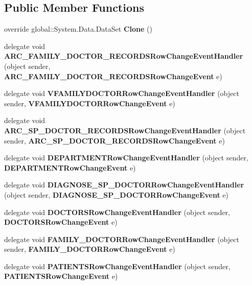 \subsection*{Public Member Functions}
\begin{CompactItemize}
\item 
override global::System.Data.DataSet \textbf{Clone} ()\label{class_automatic_medical_system_1_1_data_set1_3616d17384c19131785e376106ff992d}

\item 
delegate void \textbf{ARC\_\-FAMILY\_\-DOCTOR\_\-RECORDSRowChangeEventHandler} (object sender, {\bf ARC\_\-FAMILY\_\-DOCTOR\_\-RECORDSRowChangeEvent} e)\label{class_automatic_medical_system_1_1_data_set1_9270d1a44c7ed5979a4c626f8156d23b}

\item 
delegate void \textbf{VFAMILYDOCTORRowChangeEventHandler} (object sender, {\bf VFAMILYDOCTORRowChangeEvent} e)\label{class_automatic_medical_system_1_1_data_set1_c97eabfd791967c4874f9c057512422a}

\item 
delegate void \textbf{ARC\_\-SP\_\-DOCTOR\_\-RECORDSRowChangeEventHandler} (object sender, {\bf ARC\_\-SP\_\-DOCTOR\_\-RECORDSRowChangeEvent} e)\label{class_automatic_medical_system_1_1_data_set1_fdf19b441332bbeb510240faa8c47c3c}

\item 
delegate void \textbf{DEPARTMENTRowChangeEventHandler} (object sender, {\bf DEPARTMENTRowChangeEvent} e)\label{class_automatic_medical_system_1_1_data_set1_45eb48ca3e06fa5138e3fe201659fa2b}

\item 
delegate void \textbf{DIAGNOSE\_\-SP\_\-DOCTORRowChangeEventHandler} (object sender, {\bf DIAGNOSE\_\-SP\_\-DOCTORRowChangeEvent} e)\label{class_automatic_medical_system_1_1_data_set1_5f1fd9caae474c4fff95cff96199fff8}

\item 
delegate void \textbf{DOCTORSRowChangeEventHandler} (object sender, {\bf DOCTORSRowChangeEvent} e)\label{class_automatic_medical_system_1_1_data_set1_4a8feaa0b82b4b1d55a86eeb4d06f73a}

\item 
delegate void \textbf{FAMILY\_\-DOCTORRowChangeEventHandler} (object sender, {\bf FAMILY\_\-DOCTORRowChangeEvent} e)\label{class_automatic_medical_system_1_1_data_set1_035b94267e10b740068a5f9f9cadfdd4}

\item 
delegate void \textbf{PATIENTSRowChangeEventHandler} (object sender, {\bf PATIENTSRowChangeEvent} e)\label{class_automatic_medical_system_1_1_data_set1_844979c6fb308d308e3568cc9905712a}


\end{CompactItemize}
